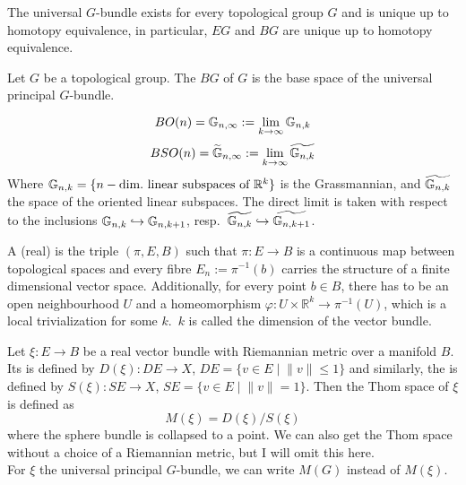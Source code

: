 \documentclass[a4paper,12pt]{article}
\begin{document}
\begin{remark}
    The universal \(G\)-bundle exists for every topological group \(G\) and is unique up to homotopy equivalence, in particular, \(EG\) and \(BG\) are unique up to homotopy equivalence.
\end{remark}

\begin{definition}
    Let \(G\) be a topological group. The  \(BG\) of \(G\) is the base space of the universal principal \(G\)-bundle.
\end{definition}

\begin{remark}\cite[p.32]{thom}
    \[BO(n)=\mathbb{G}_{n,\infty}:=\lim_{k\to\infty}\mathbb{G}_{n,k}\]
    \[BSO(n)=\widetilde{\mathbb{G}}_{n,\infty}:=\lim_{k\to\infty}\widetilde{\mathbb{G}_{n,k}}\]
    Where \(\mathbb{G}_{n,k}=\{n-\text{dim.\ linear subspaces of }\mathbb{R}^k\}\) is the Grassmannian, and \(\widetilde{\mathbb{G}_{n,k}}\) the space of the oriented linear subspaces. The direct limit is taken with respect to the inclusions \(\mathbb{G}_{n,k}\hookrightarrow\mathbb{G}_{n,k+1}\), resp.\ \(\widetilde{\mathbb{G}_{n,k}}\hookrightarrow\widetilde{\mathbb{G}_{n,k+1}}\).
\end{remark}

\begin{definition}
    A (real)  is the triple \((\pi,E,B)\) such that \(\pi:E\to B\) is a continuous map between topological spaces and every fibre \(E_n:=\pi^{-1}(b)\) carries the structure of a finite dimensional vector space.
    Additionally, for every point \(b\in B\), there has to be an open neighbourhood \(U\) and a homeomorphism \(\varphi:U\times\mathbb{R}^k\to\pi^{-1}(U)\), which is a local trivialization for some \(k\).\ \(k\) is called the dimension of the vector bundle.
\end{definition}

\begin{definition}[Thom space {\cite[p.29]{thom}}]%
    Let \(\xi:E\to B\) be a real vector bundle with Riemannian metric over a manifold \(B\). Its  is defined by \(D(\xi):DE\to X\), \(DE=\{v\in E\mid \lVert v\rVert \leq 1\}\) and similarly, the  is defined by \(S(\xi):SE\to X\), \(SE=\{v\in E\mid \lVert v\rVert = 1\}\). Then the Thom space of \(\xi\) is defined as
    \[M(\xi)=D(\xi)\big/S(\xi)\]
    where the sphere bundle is collapsed to a point. We can also get the Thom space without a choice of a Riemannian metric, but I will omit this here.\\
    For \(\xi\) the universal principal \(G\)-bundle, we can write \(M(G)\) instead of \(M(\xi)\).
\end{definition}
\end{document}
